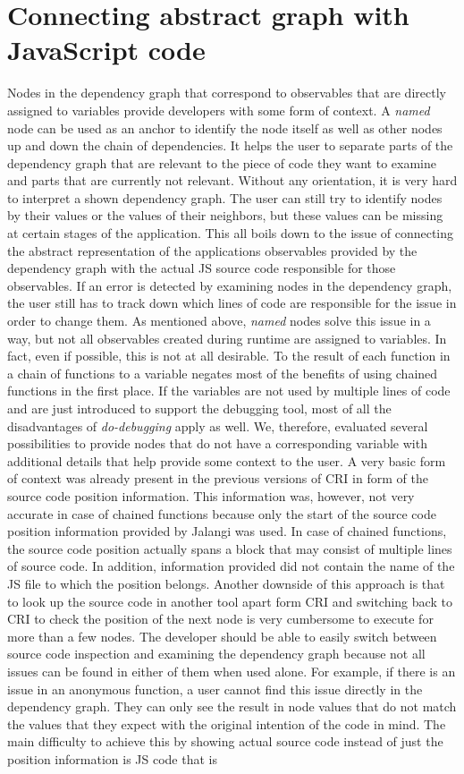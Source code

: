 \section{Connecting abstract graph with JavaScript code}
Nodes in the dependency graph that correspond to observables that are directly assigned to variables provide developers with some form of context. A \emph{named} node can be used as an anchor to identify the node itself as well as other nodes up and down the chain of dependencies. It helps the user to separate parts of the dependency graph that are relevant to the piece of code they want to examine and parts that are currently not relevant. Without any orientation, it is very hard to interpret a shown dependency graph. The user can still try to identify nodes by their values or the values of their neighbors, but these values can be missing at certain stages of the application. This all boils down to the issue of connecting the abstract representation of the applications observables provided by the dependency graph with the actual JS source code responsible for those observables. If an error is detected by examining nodes in the dependency graph, the user still has to track down which lines of code are responsible for the issue in order to change them. As mentioned above, \emph{named} nodes solve this issue in a way, but not all observables created during runtime are assigned to variables. In fact, even if possible, this is not at all desirable. To the result of each function in a chain of functions to a variable negates most of the benefits of using chained functions in the first place. If the variables are not used by multiple lines of code and are just introduced to support the debugging tool, most of all the disadvantages of \emph{do-debugging} apply as well. We, therefore, evaluated several possibilities to provide nodes that do not have a corresponding variable with additional details that help provide some context to the user. A very basic form of context was already present in the previous versions of CRI in form of the source code position information. This information was, however, not very accurate in case of chained functions because only the start of the source code position information provided by Jalangi was used. In case of chained functions, the source code position actually spans a block that may consist of multiple lines of source code. In addition, information provided did not contain the name of the JS file to which the position belongs. Another downside of this approach is that to look up the source code in another tool apart form CRI and switching back to CRI to check the position of the next node is very cumbersome to execute for more than a few nodes. The developer should be able to easily switch between source code inspection and examining the dependency graph because not all issues can be found in either of them when used alone. For example, if there is an issue in an anonymous function, a user cannot find this issue directly in the dependency graph. They can only see the result in node values that do not match the values that they expect with the original intention of the code in mind. The main difficulty to achieve this by showing actual source code instead of just the position information is JS code that is 